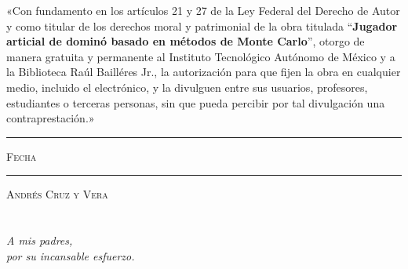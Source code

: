 \documentclass[11pt, oneside]{book}
\begin{document}

\thispagestyle{empty}

\vspace*{\fill}
\begingroup

\noindent
«Con fundamento en los artículos 21 y 27 de la Ley Federal del Derecho de Autor y como titular de los derechos moral y patrimonial de la obra titulada ``\textbf{Jugador articial de dominó basado en métodos de Monte Carlo}'', otorgo de manera gratuita y permanente al Instituto Tecnológico Autónomo de México y a la Biblioteca Raúl Bailléres Jr., la autorización para que fijen la obra en cualquier medio, incluido el electrónico, y la divulguen entre sus usuarios, profesores, estudiantes o terceras personas, sin que pueda percibir por tal divulgación una contraprestación.»


\centering 

\vspace{5em}

\rule[1em]{20em}{0.5pt} %

\textsc{Fecha}
 
\vspace{8em}

\rule[1em]{20em}{0.5pt} %

\textsc{Andrés Cruz y Vera}

\endgroup
\vspace*{\fill}


\pagestyle{plain}
\frontmatter

\chapter*{}
\begin{flushright}
\textit{A mis padres,\\ por su incansable esfuerzo.}
\end{flushright}

\end{document}
